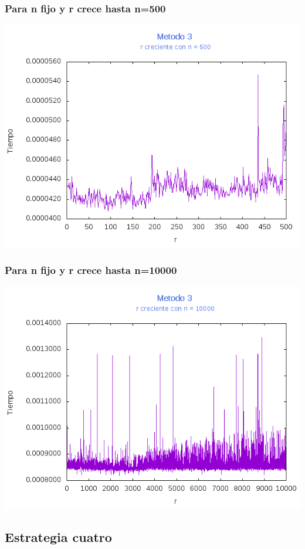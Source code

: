 \documentclass[12pt,letterpaper]{scrartcl}
\begin{document}
\subsubsection{Para n fijo y r crece hasta n=500}
\includegraphics[scale=1]{Metodo3/plot500m3}

\subsubsection{Para n fijo y r crece hasta n=10000}
\includegraphics[scale=1]{Metodo3/plot10000m3}
\newpage
\subsection{Estrategia cuatro}
\end{document}
